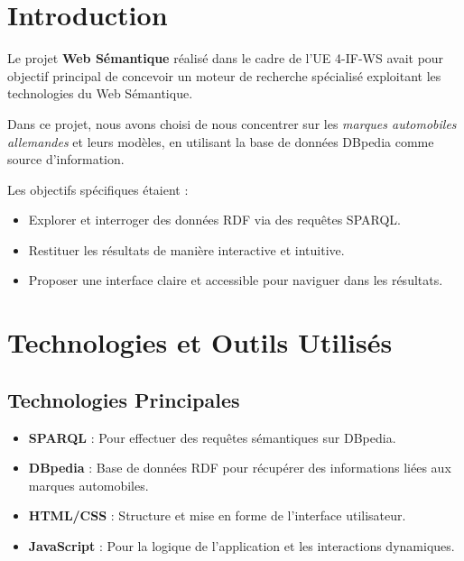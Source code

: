 \documentclass[a4paper]{article}
\begin{document}
\renewcommand{\arraystretch}{1.5}


\newpage

\section{Introduction}
Le projet \textbf{Web Sémantique} réalisé dans le cadre de l'UE 4-IF-WS avait pour objectif principal de concevoir un moteur de recherche spécialisé exploitant les technologies du Web Sémantique. 

Dans ce projet, nous avons choisi de nous concentrer sur les \textit{marques automobiles allemandes} et leurs modèles, en utilisant la base de données DBpedia comme source d'information.

Les objectifs spécifiques étaient :
\begin{itemize}
    \item Explorer et interroger des données RDF via des requêtes SPARQL.
    \item Restituer les résultats de manière interactive et intuitive.
    \item Proposer une interface claire et accessible pour naviguer dans les résultats.
\end{itemize}

\newpage

\section{Technologies et Outils Utilisés}
\subsection{Technologies Principales}
\begin{itemize}
    \item \textbf{SPARQL} : Pour effectuer des requêtes sémantiques sur DBpedia.
    \item \textbf{DBpedia} : Base de données RDF pour récupérer des informations liées aux marques automobiles.
    \item \textbf{HTML/CSS} : Structure et mise en forme de l'interface utilisateur.
    \item \textbf{JavaScript} : Pour la logique de l'application et les interactions dynamiques.
\end{itemize}
\end{document}
